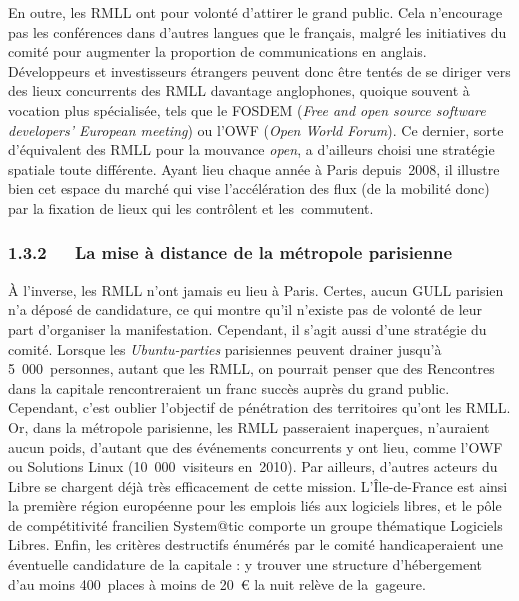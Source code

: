 \documentclass{FramateX}
\begin{document}
\begin{refsection}
En outre, les RMLL ont pour volonté d'attirer le grand public. Cela
n'encourage pas les conférences dans d'autres langues que le français,
malgré les initiatives du comité pour augmenter la proportion de
communications en anglais. Développeurs et investisseurs étrangers
peuvent donc être tentés de se diriger vers des lieux concurrents des
RMLL davantage anglophones, quoique souvent à vocation plus
spécialisée, tels que le FOSDEM (\textit{Free and open source software
developers' European meeting}) ou l'OWF (\textit{Open World Forum}). Ce
dernier, sorte d'équivalent des RMLL pour la mouvance \textit{open}, a
d'ailleurs choisi une stratégie spatiale toute différente. Ayant lieu
chaque année à Paris depuis~2008, il illustre bien cet espace du marché
qui vise l'accélération des flux (de la mobilité donc) par la fixation
de lieux qui les contrôlent et les~commutent.

\subsubsection*{1.3.2~~~La mise à distance de la métropole parisienne}
{}

À l'inverse, les RMLL n'ont jamais eu lieu à Paris. Certes, aucun GULL
parisien n'a déposé de candidature, ce qui montre qu'il n'existe pas de
volonté de leur part d'organiser la manifestation. Cependant, il s'agit
aussi d'une stratégie du comité. Lorsque les \textit{Ubuntu-parties}
parisiennes peuvent drainer jusqu'à 5~000~personnes, autant que les
RMLL, on pourrait penser que des Rencontres dans la capitale
rencontreraient un franc succès auprès du grand public. Cependant,
c'est oublier l'objectif de pénétration des territoires qu'ont les
RMLL. Or, dans la métropole parisienne, les RMLL passeraient
inaperçues, n'auraient aucun poids, d'autant que des événements
concurrents y ont lieu, comme l'OWF ou Solutions Linux
(10~000~visiteurs en~2010). Par ailleurs, d'autres acteurs du Libre se
chargent déjà très efficacement de cette mission. L'Île-de-France est
ainsi la première région européenne pour les emplois liés aux logiciels
libres, et le pôle de compétitivité francilien System@tic comporte un
groupe thématique Logiciels Libres. Enfin, les critères destructifs
énumérés par le comité handicaperaient une éventuelle candidature de la
capitale : y trouver une structure d'hébergement d'au moins 400~places
à moins de 20~€ la nuit relève de la~gageure.


\end{refsection}
\end{document}
